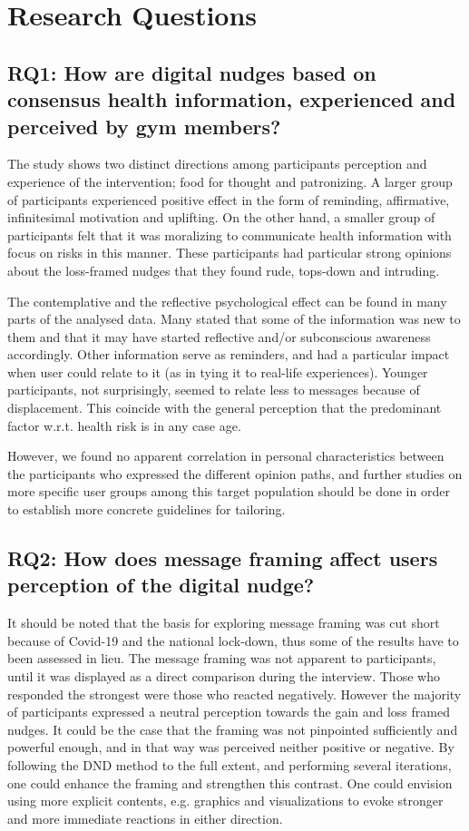 \section{Research Questions}
\subsection{RQ1: How are digital nudges based on consensus health information, experienced and perceived by gym members?}

The study shows two distinct directions among participants perception and experience of the intervention; food for thought and patronizing. A larger group of participants experienced positive effect in the form of reminding, affirmative, infinitesimal motivation and uplifting. On the other hand, a smaller group of participants felt that it was moralizing to communicate health information with focus on risks in this manner. These participants had particular strong opinions about the loss-framed nudges that they found rude, tops-down and intruding.  

The contemplative and the reflective psychological effect can be found in many parts of the analysed data. Many stated that some of the information was new to them and that it may have started reflective and/or subconscious awareness accordingly. Other information serve as reminders, and had a particular impact when user could relate to it (as in tying it to real-life experiences). Younger participants, not surprisingly, seemed to relate less to messages because of displacement. This coincide with the general perception that the predominant factor w.r.t. health risk is in any case age.

However, we found no apparent correlation in personal characteristics between the participants who expressed the different opinion paths, and further studies on more specific user groups among this target population should be done in order to establish more concrete guidelines for tailoring. 

\subsection{RQ2: How does message framing affect users perception of the digital nudge?}

It should be noted that the basis for exploring message framing was cut short because of Covid-19 and the national lock-down, thus some of the results have to been assessed in lieu. The message framing was not apparent to participants, until it was displayed as a direct comparison during the interview. Those who responded the strongest were those who reacted negatively. However the majority of participants expressed a neutral perception towards the gain and loss framed nudges. It could be the case that the framing was not pinpointed sufficiently and powerful enough, and in that way was perceived neither positive or negative. By following the DND method to the full extent, and performing several iterations, one could enhance the framing and strengthen this contrast. One could envision using more explicit contents, e.g. graphics and visualizations to evoke stronger and more immediate reactions in either direction. 

